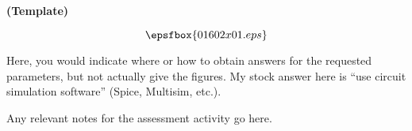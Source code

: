

\centerline{\bf (Template)}

$$\epsfbox{01602x01.eps}$$

\vfil \eject






Here, you would indicate where or how to obtain answers for the requested parameters, but not actually give the figures.  My stock answer here is ``use circuit simulation software'' (Spice, Multisim, etc.).







Any relevant notes for the assessment activity go here.



